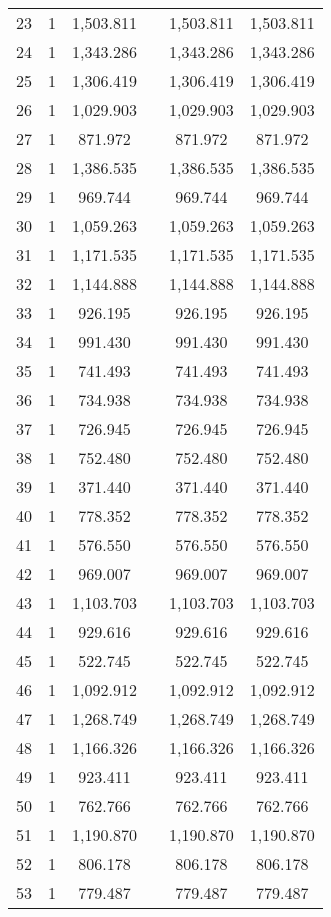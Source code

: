 \begin{table}[!htbp]
\begin{tabular}{@{\extracolsep{5pt}}lccccc}
23 & 1 & 1,503.811 &  & 1,503.811 & 1,503.811 \\ 
24 & 1 & 1,343.286 &  & 1,343.286 & 1,343.286 \\ 
25 & 1 & 1,306.419 &  & 1,306.419 & 1,306.419 \\ 
26 & 1 & 1,029.903 &  & 1,029.903 & 1,029.903 \\ 
27 & 1 & 871.972 &  & 871.972 & 871.972 \\ 
28 & 1 & 1,386.535 &  & 1,386.535 & 1,386.535 \\ 
29 & 1 & 969.744 &  & 969.744 & 969.744 \\ 
30 & 1 & 1,059.263 &  & 1,059.263 & 1,059.263 \\ 
31 & 1 & 1,171.535 &  & 1,171.535 & 1,171.535 \\ 
32 & 1 & 1,144.888 &  & 1,144.888 & 1,144.888 \\ 
33 & 1 & 926.195 &  & 926.195 & 926.195 \\ 
34 & 1 & 991.430 &  & 991.430 & 991.430 \\ 
35 & 1 & 741.493 &  & 741.493 & 741.493 \\ 
36 & 1 & 734.938 &  & 734.938 & 734.938 \\ 
37 & 1 & 726.945 &  & 726.945 & 726.945 \\ 
38 & 1 & 752.480 &  & 752.480 & 752.480 \\ 
39 & 1 & 371.440 &  & 371.440 & 371.440 \\ 
40 & 1 & 778.352 &  & 778.352 & 778.352 \\ 
41 & 1 & 576.550 &  & 576.550 & 576.550 \\ 
42 & 1 & 969.007 &  & 969.007 & 969.007 \\ 
43 & 1 & 1,103.703 &  & 1,103.703 & 1,103.703 \\ 
44 & 1 & 929.616 &  & 929.616 & 929.616 \\ 
45 & 1 & 522.745 &  & 522.745 & 522.745 \\ 
46 & 1 & 1,092.912 &  & 1,092.912 & 1,092.912 \\ 
47 & 1 & 1,268.749 &  & 1,268.749 & 1,268.749 \\ 
48 & 1 & 1,166.326 &  & 1,166.326 & 1,166.326 \\ 
49 & 1 & 923.411 &  & 923.411 & 923.411 \\ 
50 & 1 & 762.766 &  & 762.766 & 762.766 \\ 
51 & 1 & 1,190.870 &  & 1,190.870 & 1,190.870 \\ 
52 & 1 & 806.178 &  & 806.178 & 806.178 \\ 
53 & 1 & 779.487 &  & 779.487 & 779.487 \\ 

\end{tabular}
\end{table}
